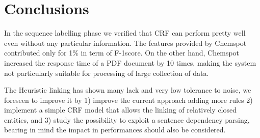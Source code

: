 \documentclass{article}
\begin{document}
\section{Conclusions}
In the sequence labelling phase we verified that CRF can perform pretty well even without any particular information. The features provided by Chemspot contributed only for 1\% in term of F-1score. On the other hand, Chemspot increased the response time of a PDF document by 10 times, making the system not particularly suitable for processing of large collection of data. 

The Heuristic linking has shown many lack and very low tolerance to noise, we foreseen to improve it by 1) improve the current approach adding more rules 2)  implement a simple CRF model that allows the linking of relatively closed entities, and 3) study the possibility to exploit a sentence dependency parsing, bearing in mind the impact in performances should also be considered.


\listoffigures



\end{document}
